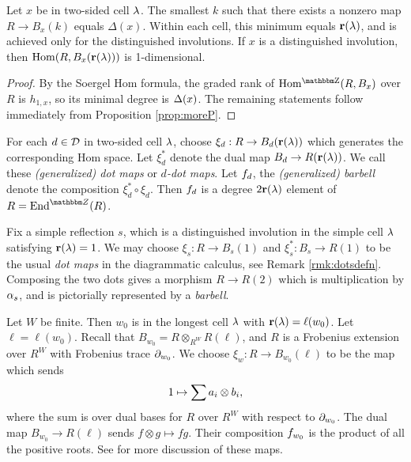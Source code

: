 \begin{proposition}\label{prop:dotspace} Let $x$ be in two-sided cell $\lambda$. The smallest $k$ such that there exists a nonzero map $R \rightarrow B_x(k)$ equals $\Delta(x)$. Within each
cell, this minimum equals $\mathbf{r}(\lambda)$, and is achieved only for the distinguished involutions. If $x$ is a distinguished involution, then $\operatorname{Hom}(R,B_x(\mathbf{r}(\lambda)))$ is 1-dimensional.
\end{proposition}

\begin{proof}
By the Soergel Hom formula, the graded rank of $\Homg(R,B_x)$ over $R$ is $h_{1,x}$, so its minimal degree is $\Delta(x)$. The remaining statements follow immediately from Proposition \ref{prop:moreP}.
\end{proof}



\begin{definition}\label{def:dots}
For each $d\in {\mathcal{D}}$ in two-sided cell $\lambda$, choose $\xi_d: R\rightarrow B_{d}(\mathbf{r}(\lambda))$ which generates the corresponding Hom space.  Let $\xi_d^\ast$ denote the dual map $B_{d}\rightarrow R(\mathbf{r}(\lambda))$. We call these \emph{(generalized) dot maps} or \emph{$d$-dot maps}. Let $f_{d}$, the \emph{(generalized) barbell} denote the composition $\xi_d^\ast \circ \xi_d$.  Then $f_{d}$ is a degree $2\mathbf{r}(\lambda)$ element of $R=\Endg(R)$. 
\end{definition}

\begin{example}\label{ex:usualDot} Fix a simple reflection $s$, which is a distinguished involution in the simple cell $\lambda$ satisfying $\mathbf{r}(\lambda)=1$. We may choose $\xi_s:R\rightarrow
B_s(1)$ and $\xi_s^\ast:B_s\rightarrow R(1)$ to be the usual \emph{dot maps} in the diagrammatic calculus, see Remark \ref{rmk:dotsdefn}. Composing the two dots gives a morphism $R
\to R(2)$ which is multiplication by $\alpha_s$, and is pictorially represented by a \emph{barbell}. \end{example}

\begin{example}\label{ex:longestBarbell}
Let $W$ be finite. Then $w_0$ is in the longest cell $\lambda$ with $\mathbf{r}(\lambda) = \ell(w_0)$. Let $\ell = \ell(w_0)$.  Recall that $B_{w_0}=R\otimes_{R^W}R(\ell)$, and $R$ is a Frobenius extension over $R^W$ with Frobenius trace $\partial_{w_0}$.  We choose $\xi_w:R \rightarrow B_{w_0}(\ell)$ to be the map which sends
\[
1\mapsto \sum a_i \otimes b_i,
\]
where the sum is over dual bases for $R$ over $R^W$ with respect to $\partial_{w_0}$. The dual map $B_{w_0}\rightarrow R(\ell)$ sends $f\otimes g\mapsto fg$.  Their composition $f_{w_0}$ is the product of all the positive roots. See \cite[\S 3.6]{EThick} for more discussion of these maps. \end{example}

